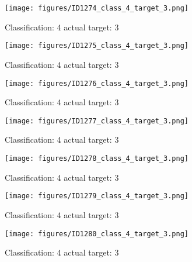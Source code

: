 \begin{figure}[h!]
\begin{center}
\texttt{[image: figures/ID1274\_class\_4\_target\_3.png]}
\end{center}
\caption{ Classification: 4 actual target: 3}
\label{fig:ID1274_class_4_target_3}
\end{figure}
\begin{figure}[h!]
\begin{center}
\texttt{[image: figures/ID1275\_class\_4\_target\_3.png]}
\end{center}
\caption{ Classification: 4 actual target: 3}
\label{fig:ID1275_class_4_target_3}
\end{figure}
\begin{figure}[h!]
\begin{center}
\texttt{[image: figures/ID1276\_class\_4\_target\_3.png]}
\end{center}
\caption{ Classification: 4 actual target: 3}
\label{fig:ID1276_class_4_target_3}
\end{figure}
\begin{figure}[h!]
\begin{center}
\texttt{[image: figures/ID1277\_class\_4\_target\_3.png]}
\end{center}
\caption{ Classification: 4 actual target: 3}
\label{fig:ID1277_class_4_target_3}
\end{figure}
\begin{figure}[h!]
\begin{center}
\texttt{[image: figures/ID1278\_class\_4\_target\_3.png]}
\end{center}
\caption{ Classification: 4 actual target: 3}
\label{fig:ID1278_class_4_target_3}
\end{figure}
\begin{figure}[h!]
\begin{center}
\texttt{[image: figures/ID1279\_class\_4\_target\_3.png]}
\end{center}
\caption{ Classification: 4 actual target: 3}
\label{fig:ID1279_class_4_target_3}
\end{figure}
\begin{figure}[h!]
\begin{center}
\texttt{[image: figures/ID1280\_class\_4\_target\_3.png]}
\end{center}
\caption{ Classification: 4 actual target: 3}
\label{fig:ID1280_class_4_target_3}
\end{figure}
